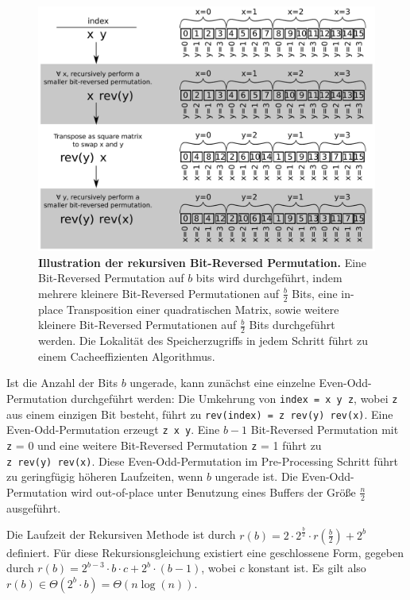 \documentclass[10pt]{article}
\begin{document}
\begin{figure}
\centering
\includegraphics[width=5in]{cartoons/recursive.pdf}
\caption{{\bf Illustration der rekursiven Bit-Reversed Permutation.} 
	Eine Bit-Reversed Permutation auf $b$ bits wird durchgeführt, indem 
	mehrere kleinere Bit-Reversed Permutationen auf $\frac{b}{2}$ Bits,
	eine in-place Transposition einer quadratischen Matrix, sowie weitere kleinere 
	Bit-Reversed Permutationen auf $\frac{b}{2}$ Bits durchgeführt werden. 
	Die Lokalität des Speicherzugriffs in jedem Schritt führt zu einem Cacheeffizienten Algorithmus.
  \label{figure:recursive}}
\end{figure}

Ist die Anzahl der Bits $b$ ungerade, kann zunächst eine einzelne Even-Odd-Permutation
durchgeführt werden: Die Umkehrung von {\tt index = x~y~z}, wobei {\tt z} aus einem 
einzigen Bit besteht, führt zu {\tt rev(index) = z~rev(y)~rev(x)}. Eine Even-Odd-Permutation
erzeugt {\tt z~x~y}. Eine $b-1$ Bit-Reversed Permutation mit {\tt z} = 0 und eine weitere Bit-Reversed 
Permutation {\tt z} = 1 führt zu {\tt z~rev(y)~rev(x)}. Diese Even-Odd-Permutation
im Pre-Processing Schritt führt zu geringfügig höheren Laufzeiten, wenn $b$ ungerade ist. 
Die Even-Odd-Permutation wird out-of-place unter Benutzung eines Buffers der Größe
$\frac{n}{2}$ ausgeführt.

Die Laufzeit der Rekursiven Methode ist durch $r(b) = 2 \cdot 2^{\frac{b}{2}} 
\cdot r(\frac{b}{2}) + 2^b$ definiert. Für diese Rekursionsgleichung existiert eine 
geschlossene Form, gegeben durch  $r(b) = 2^{b-3} \cdot b \cdot c + 2^b \cdot (b-1)$,
wobei $c$ konstant ist. Es gilt also $r(b) \in \Theta(2^b \cdot b) = \Theta(n
\log(n))$.
\end{document}
